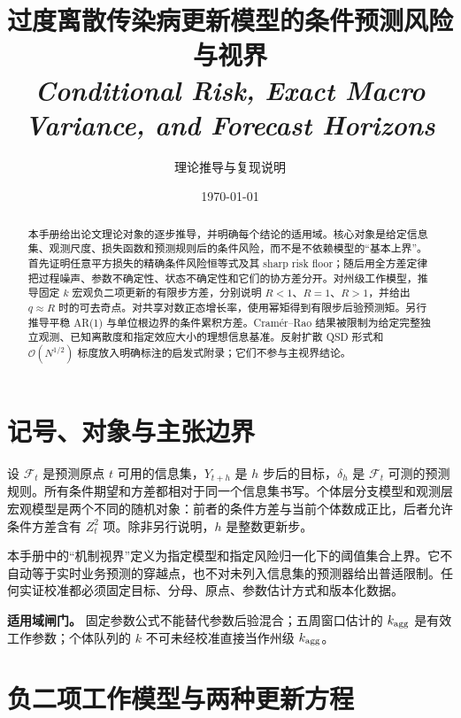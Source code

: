 \documentclass[11pt,a4paper]{article}
\title{\textbf{\LARGE 过度离散传染病更新模型的条件预测风险与视界}\\[0.5em]
\large \textit{Conditional Risk, Exact Macro Variance, and Forecast Horizons}}
\author{理论推导与复现说明}
\date{\today}
\theoremstyle{remark}
\begin{document}
\maketitle

\begin{abstract}
本手册给出论文理论对象的逐步推导，并明确每个结论的适用域。核心对象是给定信息集、观测尺度、损失函数和预测规则后的条件风险，而不是不依赖模型的“基本上界”。首先证明任意平方损失的精确条件风险恒等式及其 sharp risk floor；随后用全方差定律把过程噪声、参数不确定性、状态不确定性和它们的协方差分开。对州级工作模型，推导固定 $k$ 宏观负二项更新的有限步方差，分别说明 $R<1$、$R=1$、$R>1$，并给出 $q\approx R$ 时的可去奇点。对共享对数正态增长率，使用幂矩得到有限步后验预测矩。另行推导平稳 AR(1) 与单位根边界的条件累积方差。Cramér--Rao 结果被限制为给定完整独立观测、已知离散度和指定效应大小的理想信息基准。反射扩散 QSD 形式和 $\mathcal O(N^{1/2})$ 标度放入明确标注的启发式附录；它们不参与主视界结论。
\end{abstract}

\tableofcontents
\newpage

\section{记号、对象与主张边界}
设 $\mathcal F_t$ 是预测原点 $t$ 可用的信息集，$Y_{t+h}$ 是 $h$ 步后的目标，$\delta_h$ 是 $\mathcal F_t$ 可测的预测规则。所有条件期望和方差都相对于同一个信息集书写。个体层分支模型和观测层宏观模型是两个不同的随机对象：前者的条件方差与当前个体数成正比，后者允许条件方差含有 $Z_t^2$ 项。除非另行说明，$h$ 是整数更新步。

本手册中的“机制视界”定义为指定模型和指定风险归一化下的阈值集合上界。它不自动等于实时业务预测的穿越点，也不对未列入信息集的预测器给出普适限制。任何实证校准都必须固定目标、分母、原点、参数估计方式和版本化数据。

\begin{notebox}
\textbf{适用域闸门。} 固定参数公式不能替代参数后验混合；五周窗口估计的 $k_{\rm agg}$ 是有效工作参数；个体队列的 $k$ 不可未经校准直接当作州级 $k_{\rm agg}$。
\end{notebox}

\section{负二项工作模型与两种更新方程}
\end{document}
